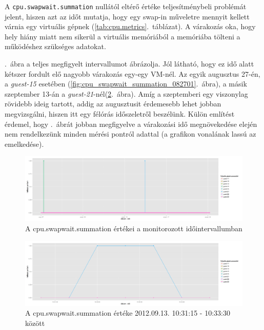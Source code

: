\documentclass[a4paper,10pt,titlepage]{article}
\begin{document}
A \texttt{cpu.swapwait.summation} nullától eltérő értéke teljesítménybeli problémát jelent, hiszen azt az időt mutatja, hogy egy swap-in műveletre mennyit kellett várnia egy virtuális gépnek (\ref{tab:cpu.metrics}.~táblázat). A várakozás oka, hogy hely hiány miatt nem sikerül a virtuális memóriából a memóriába tölteni a működéshez szükséges adatokat.

.~ábra a teljes megfigyelt intervallumot ábrázolja. Jól látható, hogy ez idő alatt kétszer fordult elő nagyobb várakozás egy-egy VM-nél. Az egyik augusztus 27-én, a \textit{guest-15} esetében (\ref{fig:cpu_swapwait_summation_082701}.~ábra), a másik szeptember 13-án a \textit{guest-21}-nél(\ref{fig:cpu_swapwait_summation_0913}.~ábra). Amíg a szeptemberi egy viszonylag rövidebb ideig tartott, addig az augusztusit érdemesebb lehet jobban megvizsgálni, hiszen itt egy félórás időszeletről beszélünk. Külön említést érdemel, hogy .~ábrát jobban megfigyelve a várakozási idő megnövekedése elején nem rendelkezünk minden mérési pontról adattal (a grafikon vonalának lassú az emelkedése).

\begin{figure}[h!]
\centering
\includegraphics[width=1.00\textwidth]{figures/cpu_swapwait_summation-20120826230140-20120924083120.png}
\caption{A cpu.swapwait.summation értékei a monitorozott időintervallumban \label{fig:cpu_swapwait_summation}}
\end{figure}

\begin{figure}[h!]
\centering
\includegraphics[width=1.00\textwidth]{figures/cpu_swapwait_summation-20120913103115-20120913103330.png}
\caption{A cpu.swapwait.summation értéke 2012.09.13. 10:31:15 - 10:33:30 között \label{fig:cpu_swapwait_summation_0913}}
\end{figure}
\end{document}
